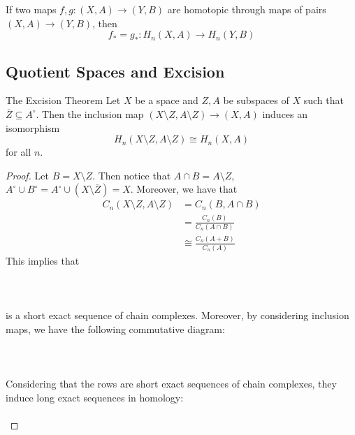 \documentclass[a4paper]{article}
\begin{document}
\begin{prp}{}{} If two maps $f,g:(X,A)\to (Y,B)$ are homotopic through maps of pairs $(X,A)\to(Y,B)$, then $$f_\ast=g_\ast:H_n(X,A)\to H_n(Y,B)$$ 
\end{prp}

\subsection{Quotient Spaces and Excision}
\begin{thm}{The Excision Theorem}{} Let $X$ be a space and $Z,A$ be subspaces of $X$ such that $\overline{Z}\subseteq A^\circ$. Then the inclusion map $(X\setminus Z,A\setminus Z)\to (X,A)$ induces an isomorphism $$H_n(X\setminus Z,A\setminus Z)\cong H_n(X,A)$$ for all $n$. \tcbline
\begin{proof}
Let $B=X\setminus Z$. Then notice that $A\cap B=A\setminus Z$, $A^\circ\cup B^\circ=A^\circ\cup(X\setminus\overline{Z})=X$. Moreover, we have that 
\begin{align*}
C_n(X\setminus Z,A\setminus Z)&=C_n(B,A\cap B)\\
&=\frac{C_n(B)}{C_n(A\cap B)}\tag{By definition}\\
&\cong\frac{C_n(A+B)}{C_n(A)}\tag{Second Isomorphism Theorem}
\end{align*}
This implies that \\~\\
\\~\\
is a short exact sequence of chain complexes. Moreover, by considering inclusion maps, we have the following commutative diagram: \\~\\
\\~\\
Considering that the rows are short exact sequences of chain complexes, they induce long exact sequences in homology: \\~\\

\end{proof}
\end{thm}
\end{document}
